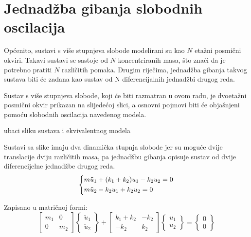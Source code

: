 \section{Jednadžba gibanja slobodnih oscilacija}\label{slobodne_oscilacije}
Općenito, sustavi s više stupnjeva slobode modelirani su kao $N$ etažni posmični
okviri. Takavi sustavi se sastoje od $N$ koncentriranih masa, što znači da je potrebno 
pratiti $N$ različitih pomaka. Drugim riječima, jednadžba gibanja takvog sustava biti će
zadana kao sustav od N diferencijalnih jednadžbi drugog reda.
\par

Sustav s više stupnjeva slobode, koji će biti razmatran u ovom radu, je dvoetažni
posmični okvir prikazan na slijedećoj slici, a osnovni pojmovi biti će objašnjeni
pomoću slobodnih oscilacija navedenog modela.

\par
ubaci sliku sustava i ekvivalentnog modela
\par

Sustavi sa slike imaju dva dinamička stupnja slobode jer su moguće dvije translacije
dviju različitih masa, pa jednadžbu gibanja opisuje sustav od dvije diferencijelne
jednadžbe drugog reda.
\begin{equation}\label{eq:sustav_diferencijalnih}
    \begin{dcases}
        m\ddot{u}_1 + (k_1+k_2)u_1 -k_2u_2 = 0\\
        m\ddot{u}_2 - k_2u_1 + k_2 u_2 = 0
    \end{dcases}
\end{equation}

Zapisano u matričnoj formi:
\begin{equation}\label{eq:sustav_diferencijalnih_matricno}
    \begin{bmatrix}
        m_1 & 0 \\
        0   & m_2
    \end{bmatrix}
    \begin{Bmatrix}
        \ddot{u}_1\\
        \ddot{u}_2
    \end{Bmatrix}
    +
    \begin{bmatrix}
        k_1+k_2 & -k_2\\
        -k_2 & k_2
    \end{bmatrix}
    \begin{Bmatrix}
        u_1\\
        u_2
    \end{Bmatrix}
    =
    \begin{Bmatrix}
        0\\
        0
    \end{Bmatrix}
\end{equation}

